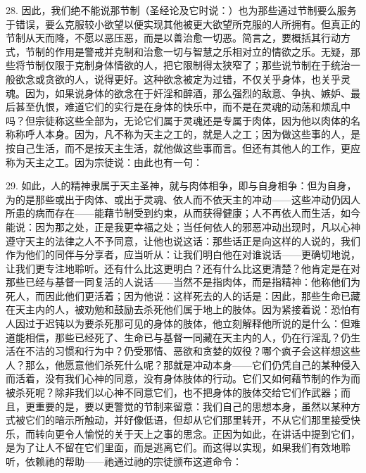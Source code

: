 28. 因此，我们绝不能说那节制（圣经论及它时说：）也为那些通过节制要么服务于错误，要么克服较小欲望以便实现其他被更大欲望所克服的人所拥有。但真正的节制从天而降，不愿以恶压恶，而是以善治愈一切恶。简言之，要概括其行动方式，节制的作用是警戒并克制和治愈一切与智慧之乐相对立的情欲之乐。无疑，那些将节制仅限于克制身体情欲的人，把它限制得太狭窄了；那些说节制在于统治一般欲念或贪欲的人，说得更好。这种欲念被定为过错，不仅关乎身体，也关乎灵魂。因为，如果说身体的欲念在于奸淫和醉酒，那么强烈的敌意、争执、嫉妒、最后甚至仇恨，难道它们的实行是在身体的快乐中，而不是在灵魂的动荡和烦乱中吗？但宗徒称这些全部为，无论它们属于灵魂还是专属于肉体，因为他以肉体的名称称呼人本身。因为，凡不称为天主之工的，就是人之工；因为做这些事的人，是按自己生活，而不是按天主生活，就他做这些事而言。但还有其他人的工作，更应称为天主之工。因为宗徒说：由此也有一句：\par

29. 如此，人的精神隶属于天主圣神，就与肉体相争，即与自身相争：但为自身，为的是那些或出于肉体、或出于灵魂、依人而不依天主的冲动——这些冲动仍因人所患的病而存在——能藉节制受到约束，从而获得健康；人不再依人而生活，如今能说：因为那之处，正是我更幸福之处；当任何依人的邪恶冲动出现时，凡以心神遵守天主的法律之人不予同意，让他也说这话：那些话正是向这样的人说的，我们作为他们的同伴与分享者，应当听从：让我们明白他在对谁说话——更确切地说，让我们更专注地聆听。还有什么比这更明白？还有什么比这更清楚？他肯定是在对那些已经与基督一同复活的人说话——当然不是指肉体，而是指精神：他称他们为死人，而因此他们更活着；因为他说：这样死去的人的话是：因此，那些生命已藏在天主内的人，被劝勉和鼓励去杀死他们属于地上的肢体。因为紧接着说：恐怕有人因过于迟钝以为要杀死那可见的身体的肢体，他立刻解释他所说的是什么：但难道能相信，那些已经死了、生命已与基督一同藏在天主内的人，仍在行淫乱？仍生活在不洁的习惯和行为中？仍受邪情、恶欲和贪婪的奴役？哪个疯子会这样想这些人？那么，他愿意他们杀死什么呢？那就是冲动本身——它们仍凭自己的某种侵入而活着，没有我们心神的同意，没有身体肢体的行动。它们又如何藉节制的作为而被杀死呢？除非我们以心神不同意它们，也不把身体的肢体交给它们作武器；而且，更重要的是，要以更警觉的节制来留意：我们自己的思想本身，虽然以某种方式被它们的暗示所触动，并好像低语，但却从它们那里转开，不从它们那里接受快乐，而转向更令人愉悦的关于天上之事的思念。正因为如此，在讲话中提到它们，是为了让人不留在它们里面，而是逃离它们。而这得以实现，如果我们有效地聆听，依赖祂的帮助——祂通过祂的宗徒颁布这道命令：\par

